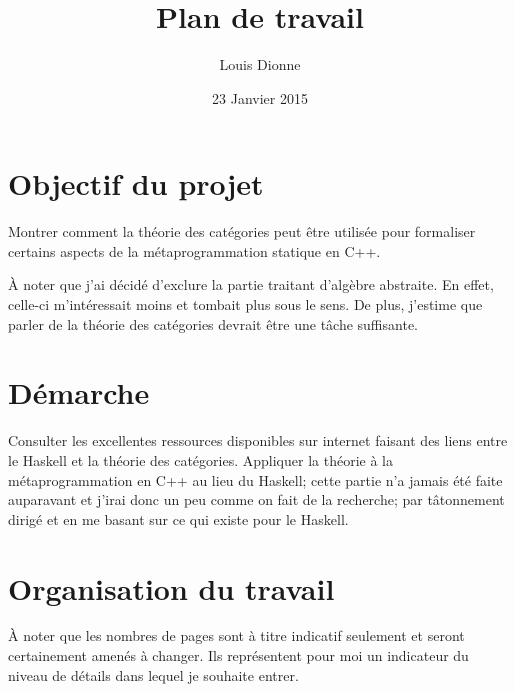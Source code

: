 \documentclass{article}
\title{Plan de travail}
\author{Louis Dionne}
\date{23 Janvier 2015}
\begin{document}
\maketitle


\section{Objectif du projet}
Montrer comment la théorie des catégories peut être utilisée pour formaliser
certains aspects de la métaprogrammation statique en C++.

À noter que j'ai décidé d'exclure la partie traitant d'algèbre abstraite. En
effet, celle-ci m'intéressait moins et tombait plus sous le sens. De plus,
j'estime que parler de la théorie des catégories devrait être une tâche
suffisante.

\section{Démarche}
Consulter les excellentes ressources disponibles sur internet faisant des
liens entre le Haskell et la théorie des catégories. Appliquer la théorie
à la métaprogrammation en C++ au lieu du Haskell; cette partie n'a jamais
été faite auparavant et j'irai donc un peu comme on fait de la recherche;
par tâtonnement dirigé et en me basant sur ce qui existe pour le Haskell.

\section{Organisation du travail}
À noter que les nombres de pages sont à titre indicatif seulement et seront
certainement amenés à changer. Ils représentent pour moi un indicateur du
niveau de détails dans lequel je souhaite entrer.
\end{document}
